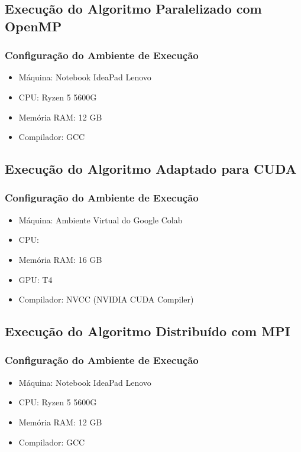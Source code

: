 \subsection{Execução do Algoritmo Paralelizado com OpenMP}
\subsubsection{Configuração do Ambiente de Execução}
\begin{itemize}
    \item Máquina: Notebook IdeaPad Lenovo
    \item CPU: Ryzen 5 5600G
    \item Memória RAM: 12 GB
    \item Compilador: GCC
\end{itemize}

\subsection{Execução do Algoritmo Adaptado para CUDA}
\subsubsection{Configuração do Ambiente de Execução}
\begin{itemize}
    \item Máquina: Ambiente Virtual do Google Colab
    \item CPU:
    \item Memória RAM: 16 GB
    \item GPU: T4
    \item Compilador: NVCC (NVIDIA CUDA Compiler)
\end{itemize}

\subsection{Execução do Algoritmo Distribuído com MPI}
\subsubsection{Configuração do Ambiente de Execução}
\begin{itemize}
    \item Máquina: Notebook IdeaPad Lenovo
    \item CPU: Ryzen 5 5600G
    \item Memória RAM: 12 GB
    \item Compilador: GCC
\end{itemize}


